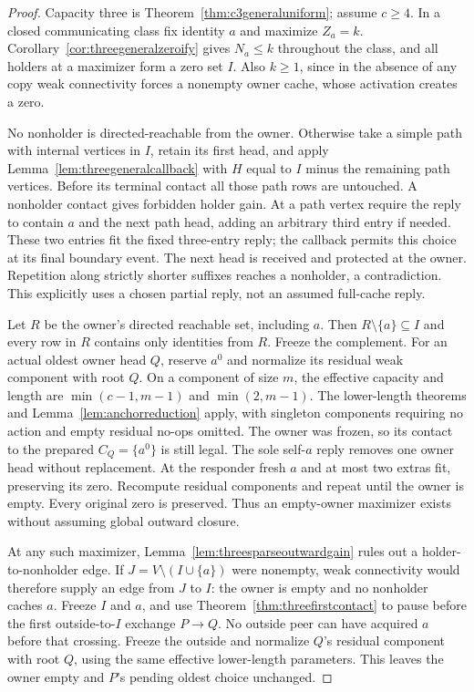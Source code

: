 \documentclass[11pt]{article}
\begin{document}
\begin{proof}
Capacity three is Theorem~\ref{thm:c3generaluniform}; assume
$c\ge4$. In a closed communicating class fix identity $a$
and maximize $Z_a=k$. Corollary~\ref{cor:threegeneralzeroify}
gives $N_a\le k$ throughout the class, and all holders at a
maximizer form a zero set $I$. Also $k\ge1$, since in the
absence of any copy weak connectivity forces a nonempty owner
cache, whose activation creates a zero.

No nonholder is directed-reachable from the owner. Otherwise
take a simple path with internal vertices in $I$, retain its
first head, and apply Lemma~\ref{lem:threegeneralcallback}
with $H$ equal to $I$ minus the remaining path vertices.
Before its terminal contact all those path rows are untouched.
A nonholder contact gives forbidden holder gain. At a path
vertex require the reply to contain $a$ and the next path head,
adding an arbitrary third entry if needed. These two entries
fit the fixed three-entry reply; the callback permits this
choice at its final boundary event. The next head is received
and protected at the owner. Repetition along strictly shorter
suffixes reaches a nonholder, a contradiction. This explicitly
uses a chosen partial reply, not an assumed full-cache reply.

Let $R$ be the owner's directed reachable set, including $a$.
Then $R\setminus\{a\}\subseteq I$ and every row in $R$
contains only identities from $R$. Freeze the complement.
For an actual oldest owner head $Q$, reserve $a^0$ and
normalize its residual weak component with root $Q$. On a
component of size $m$, the effective capacity and length are
$\min(c-1,m-1)$ and $\min(2,m-1)$. The lower-length theorems
and Lemma~\ref{lem:anchorreduction} apply, with singleton
components requiring no action and empty residual no-ops
omitted. The owner was frozen, so its contact to the prepared
$C_Q=\{a^0\}$ is still legal. The sole self-$a$ reply removes
one owner head without replacement. At the responder fresh
$a$ and at most two extras fit, preserving its zero. Recompute
residual components and repeat until the owner is empty.
Every original zero is preserved. Thus an empty-owner maximizer
exists without assuming global outward closure.

At any such maximizer, Lemma~\ref{lem:threesparseoutwardgain}
rules out a holder-to-nonholder edge. If
$J=V\setminus(I\cup\{a\})$ were nonempty, weak connectivity
would therefore supply an edge from $J$ to $I$: the owner is
empty and no nonholder caches $a$. Freeze $I$ and $a$, and use
Theorem~\ref{thm:threefirstcontact} to pause before the first
outside-to-$I$ exchange $P\to Q$. No outside peer can have
acquired $a$ before that crossing. Freeze the outside and
normalize $Q$'s residual component with root $Q$, using the
same effective lower-length parameters. This leaves the owner
empty and $P$'s pending oldest choice unchanged.


\end{proof}
\end{document}
